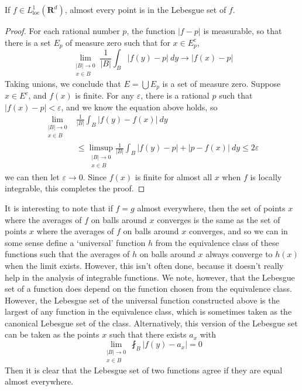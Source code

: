 \begin{theorem}
    If $f \in L^1_{\text{loc}}(\mathbf{R}^d)$, almost every point is in the Lebesgue set of $f$.
\end{theorem}
\begin{proof}
    For each rational number $p$, the function $|f - p|$ is measurable, so that there is a set $E_p$ of measure zero such that for $x \in E_p^c$,
    \[ \lim_{\substack{|B| \to 0\\x \in B}} \frac{1}{|B|} \int_B |f(y) - p|\ dy \to |f(x) - p| \]
    Taking unions, we conclude that $E = \bigcup E_p$ is a set of measure zero. Suppose $x \in E^c$, and $f(x)$ is finite. For any $\varepsilon$, there is a rational $p$ such that $|f(x) - p| < \varepsilon$, and we know the equation above holds, so
    \begin{align*}
        \lim_{\substack{|B| \to 0\\x \in B}} &\frac{1}{|B|} \int_B |f(y) - f(x)|\ dy\\
        &\leq \limsup_{\substack{|B| \to 0\\x \in B}} \frac{1}{|B|} \int_B |f(y) - p| + |p - f(x)|\ dy \leq 2\varepsilon
    \end{align*}
    we can then let $\varepsilon \to 0$. Since $f(x)$ is finite for almost all $x$ when $f$ is locally integrable, this completes the proof.
\end{proof}

It is interesting to note that if $f = g$ almost everywhere, then the set of points $x$ where the averages of $f$ on balls around $x$ converges is the same as the set of points $x$ where the averages of $f$ on balls around $x$ converges, and so we can in some sense define a `universal' function $h$ from the equivalence class of these functions such that the averages of $h$ on balls around $x$ always converge to $h(x)$ when the limit exists. However, this isn't often done, because it doesn't really help in the analysis of integrable functions. We note, however, that the Lebesgue set of a function does depend on the function chosen from the equivalence class. However, the Lebesgue set of the universal function constructed above is the largest of any function in the equivalence class, which is sometimes taken as the canonical Lebesgue set of the class. Alternatively, this version of the Lebesgue set can be taken as the points $x$ such that there exists $a_x$ with
%
\[ \lim_{\substack{|B| \to 0 \\ x \in B}} \fint_B |f(y) - a_x| = 0 \]
%
Then it is clear that the Lebesgue set of two functions agree if they are equal almost everywhere.

